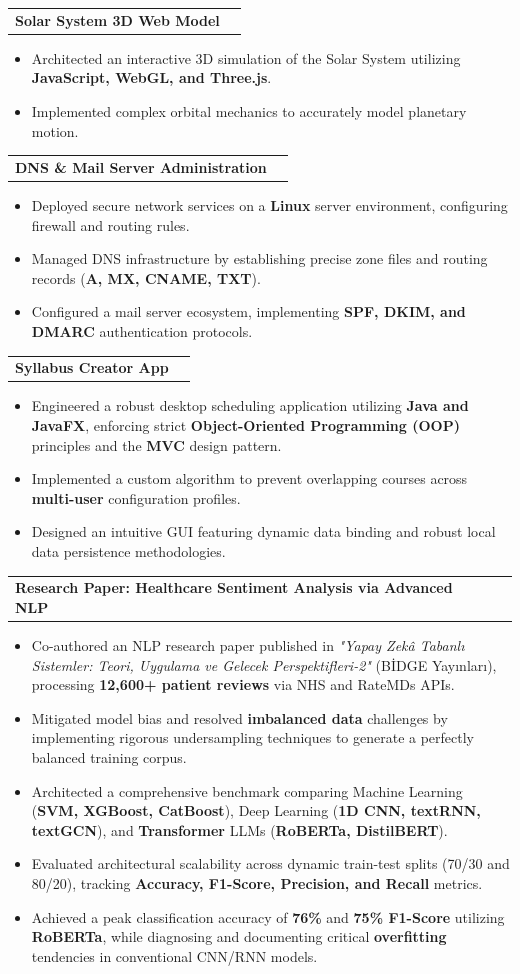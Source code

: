 \documentclass[letterpaper,11pt]{article}
\newcommand{\resumeItem}[1]{
  \item\small{
    {#1 \vspace{-4pt}}
  }
}
\newcommand{\resumeProjectHeading}[2]{
    \item
    \begin{tabularx}{0.97\textwidth}{X r}
      \textbf{#1} & #2 \\
    \end{tabularx}\vspace{-5pt}
}
\newcommand{\resumeItemListStart}{\begin{itemize}}
\newcommand{\resumeItemListEnd}{\end{itemize}\vspace{-5pt}}
\begin{document}
      \resumeProjectHeading
          {\textbf{Solar System 3D Web Model} }{}
          \resumeItemListStart
            \resumeItem{Architected an interactive 3D simulation of the Solar System utilizing \textbf{JavaScript, WebGL, and Three.js}.}
            \resumeItem{Implemented complex orbital mechanics to accurately model planetary motion.}
          \resumeItemListEnd

      \resumeProjectHeading
          {\textbf{DNS \& Mail Server Administration} }{}
          \resumeItemListStart
            \resumeItem{Deployed secure network services on a \textbf{Linux} server environment, configuring firewall and routing rules.}
            \resumeItem{Managed DNS infrastructure by establishing precise zone files and routing records (\textbf{A, MX, CNAME, TXT}).}
            \resumeItem{Configured a mail server ecosystem, implementing \textbf{SPF, DKIM, and DMARC} authentication protocols.}
          \resumeItemListEnd

      \resumeProjectHeading
          {\textbf{Syllabus Creator App} }{}
          \resumeItemListStart
            \resumeItem{Engineered a robust desktop scheduling application utilizing \textbf{Java and JavaFX}, enforcing strict \textbf{Object-Oriented Programming (OOP)} principles and the \textbf{MVC} design pattern.}
            \resumeItem{Implemented a custom algorithm to prevent overlapping courses across \textbf{multi-user} configuration profiles.}
            \resumeItem{Designed an intuitive GUI featuring dynamic data binding and robust local data persistence methodologies.}
          \resumeItemListEnd

          \resumeProjectHeading
          {\textbf{Research Paper: Healthcare Sentiment Analysis via Advanced NLP} }{}
          \resumeItemListStart
            \resumeItem{Co-authored an NLP research paper published in \textit{"Yapay Zekâ Tabanlı Sistemler: Teori, Uygulama ve Gelecek Perspektifleri-2"} (BİDGE Yayınları), processing \textbf{12,600+ patient reviews} via NHS and RateMDs APIs.}
            \resumeItem{Mitigated model bias and resolved \textbf{imbalanced data} challenges by implementing rigorous undersampling techniques to generate a perfectly balanced training corpus.}
            \resumeItem{Architected a comprehensive benchmark comparing Machine Learning (\textbf{SVM, XGBoost, CatBoost}), Deep Learning (\textbf{1D CNN, textRNN, textGCN}), and \textbf{Transformer} LLMs (\textbf{RoBERTa, DistilBERT}).}
            \resumeItem{Evaluated architectural scalability across dynamic train-test splits (70/30 and 80/20), tracking \textbf{Accuracy, F1-Score, Precision, and Recall} metrics.}
            \resumeItem{Achieved a peak classification accuracy of \textbf{76\%} and \textbf{75\% F1-Score} utilizing \textbf{RoBERTa}, while diagnosing and documenting critical \textbf{overfitting} tendencies in conventional CNN/RNN models.}
          \resumeItemListEnd
\end{document}
